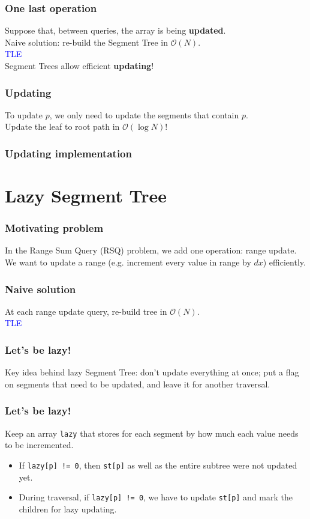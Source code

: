 \documentclass[12pt]{beamer}
\newcommand{\bigoh}{\mathcal{O}}
\begin{document}
\begin{frame}
    \frametitle{One last operation}
    Suppose that, between queries, the array is being \textbf{updated}.\\
    Naive solution: re-build the Segment Tree in $ \bigoh(N) $. \\
    \textcolor{blue}{TLE} \\
    Segment Trees allow efficient \textbf{updating}!
\end{frame}

\begin{frame}
    \frametitle{Updating}
    To update $p$, we only need to update the segments that contain $p$. \\
    Update the leaf to root path in $ \bigoh(\log N) $!
\end{frame}

\begin{frame}
    \frametitle{Updating implementation}
    
\end{frame}

\section{Lazy Segment Tree}

\begin{frame}
    \frametitle{Motivating problem}
    In the Range Sum Query (RSQ) problem, we add one operation: range update. \\
    We want to update a range (e.g. increment every value in range by $dx$) efficiently.
\end{frame}

\begin{frame}
    \frametitle{Naive solution}
    At each range update query, re-build tree in $\bigoh(N)$. \\
    \textcolor{blue}{TLE}
\end{frame}

\begin{frame}
    \frametitle{Let's be lazy!}
    Key idea behind lazy Segment Tree: don't update everything at once; put a flag on segments that need to be updated, and leave it for another traversal.
\end{frame}

\begin{frame}
    \frametitle{Let's be lazy!}
    Keep an array \lstinline{lazy} that stores for each segment by how much each value needs to be incremented.

    \begin{itemize}
        \item If \lstinline{lazy[p] != 0}, then \lstinline{st[p]} as well as the entire subtree were not updated yet.
        \item During traversal, if \lstinline{lazy[p] != 0}, we have to update \lstinline{st[p]} and mark the children for lazy updating.
    \end{itemize}
\end{frame}
\end{document}
